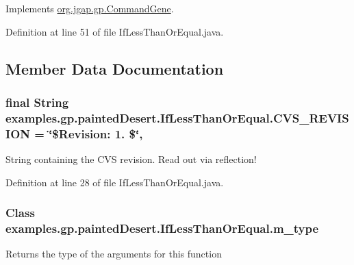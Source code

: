 Implements \hyperlink{classorg_1_1jgap_1_1gp_1_1_command_gene_a236141d99059da808afe7a9217e411c7}{org.\-jgap.\-gp.\-Command\-Gene}.



Definition at line 51 of file If\-Less\-Than\-Or\-Equal.\-java.



\subsection{Member Data Documentation}
\hypertarget{classexamples_1_1gp_1_1painted_desert_1_1_if_less_than_or_equal_aeaea6d9a7c669d19be8910c047ce181b}{
\subsubsection[{C\-V\-S\-\_\-\-R\-E\-V\-I\-S\-I\-O\-N}]{\setlength{\rightskip}{0pt plus 5cm}final String examples.\-gp.\-painted\-Desert.\-If\-Less\-Than\-Or\-Equal.\-C\-V\-S\-\_\-\-R\-E\-V\-I\-S\-I\-O\-N = \char`\"{}\$Revision\-: 1. \$\char`\"{}\hspace{0.3cm}{\ttfamily [static]}, {\ttfamily [private]}}}\label{classexamples_1_1gp_1_1painted_desert_1_1_if_less_than_or_equal_aeaea6d9a7c669d19be8910c047ce181b}
String containing the C\-V\-S revision. Read out via reflection! 

Definition at line 28 of file If\-Less\-Than\-Or\-Equal.\-java.

\hypertarget{classexamples_1_1gp_1_1painted_desert_1_1_if_less_than_or_equal_ac958249b106da8b0e9eece489e87ffe2}{
\subsubsection[{m\-\_\-type}]{\setlength{\rightskip}{0pt plus 5cm}Class examples.\-gp.\-painted\-Desert.\-If\-Less\-Than\-Or\-Equal.\-m\-\_\-type\hspace{0.3cm}{\ttfamily [private]}}}\label{classexamples_1_1gp_1_1painted_desert_1_1_if_less_than_or_equal_ac958249b106da8b0e9eece489e87ffe2}
Returns the type of the arguments for this function 

